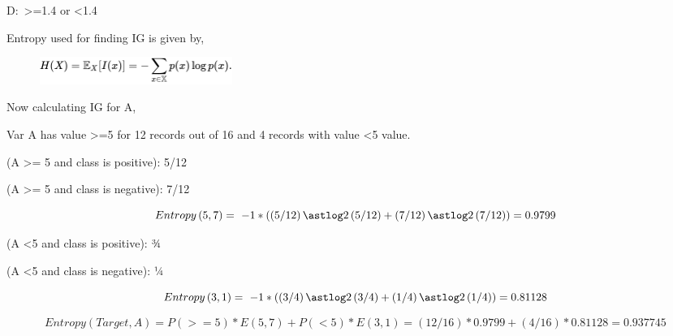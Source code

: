 \documentclass[12pt]{article}
\renewcommand{\_}{\kern-1.5pt\textunderscore\kern-1.5pt}
\begin{document}
D:\  >=1.4 or <1.4\par

Entropy used for finding IG is given by,\par




\begin{figure}[H]
	\begin{Center}
		\includegraphics[width=2.49in,height=0.35in]{./media/image2.png}
	\end{Center}
\end{figure}



\par

Now calculating IG for A, \par

\setlength{\parskip}{5.04pt}
Var A has value >=5 for 12 records out of 16 and 4 records with value <5 value.\par

(A >= 5 and class is positive): 5/12\par

(A >= 5 and class is negative): 7/12\par

 \[ Entropy \left( 5,7 \right)  = -1 \ast  \left(   \left( 5/12 \right) \astlog2 \left( 5/12 \right)  +  \left( 7/12 \right) \astlog2 \left( 7/12 \right)  \right)  = 0.9799 \] \par

(A <5 and class is positive): ¾\par

(A <5 and class is negative): ¼\par

 \[ Entropy \left( 3,1 \right)  =  -1 \ast  \left(   \left( 3/4 \right) \astlog2 \left( 3/4 \right)  +  \left( 1/4 \right) \astlog2 \left( 1/4 \right)  \right)  = 0.81128 \] \par

 \[ Entropy \left( Target, A \right)  = P \left( >=5 \right)  \ast E \left( 5,7 \right)  + P \left( <5 \right)  \ast E \left( 3,1 \right) =  \left( 12/16 \right)  \ast 0.9799 +  \left( 4/16 \right)  \ast 0.81128 = 0.937745 \] \par
\end{document}

